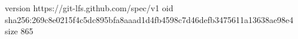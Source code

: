 version https://git-lfs.github.com/spec/v1
oid sha256:269c8e0215f4c5dc895bfa8aaad1d4fb4598c7d46defb3475611a13638ae98e4
size 865
